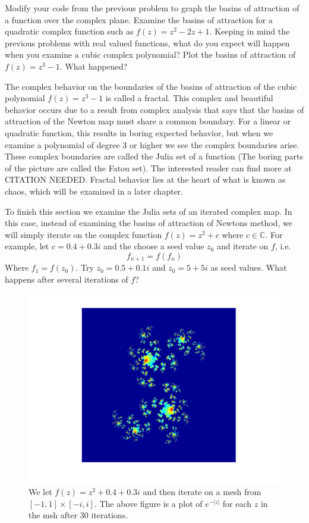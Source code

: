 \begin{problem}
Modify your code from the previous problem to graph the basins of attraction of a function over the complex plane.  Examine the basins of attraction for a quadratic complex function such as $f(z) = z^2 - 2z + 1$.  Keeping in mind the previous problems with real valued functions, what do you expect will happen when you examine a cubic complex polynomial?  Plot the basins of attraction of $f(z) = z^3 - 1$.  What happened?
\end{problem}

The complex behavior on the boundaries of the basins of attraction of the cubic polynomial $f(z) = z^3 - 1$ is called a fractal.  This complex and beautiful behavior occurs due to a result from complex analysis that says that the basins of attraction of the Newton map must share a common boundary.  For a linear or quadratic function, this results in boring expected behavior, but when we examine a polynomial of degree 3 or higher we see the complex boundaries arise.  These complex boundaries are called the Julia set of a function (The boring parts of the picture are called the Fatou set).  The interested reader can find more at CITATION NEEDED. Fractal behavior lies at the heart of what is known as chaos, which will be examined in a later chapter.

To finish this section we examine the Julia sets of an iterated complex map.  In this case, instead of examining the basins of attraction of Newtons method, we will simply iterate on the complex function $f(z) = z^2 + c$ where $c \in \mathbb{C}$.  For example, let $c = 0.4 + 0.3i$ and the choose a seed value $z_0$ and iterate on $f$, i.e.
\[
f_{n+1} = f(f_n)
\]
Where $f_1 = f(z_0)$.  Try $z_0 = 0.5 + 0.1i$ and $z_0 = 5 + 5i$ as seed values.  What happens after several iterations of $f$?

\begin{figure}\label{Fig:julia}
\begin{center}
\includegraphics[scale=0.5]{./Figures/julia}
\caption{We let $f(z) = z^2 + 0.4 + 0.3i$ and then iterate on a mesh from $[-1,1]\times[-i,i]$.  The above figure is a plot of $e^{-|z|}$ for each $z$ in the msh after $30$ iterations.}
\end{center}
\end{figure}


